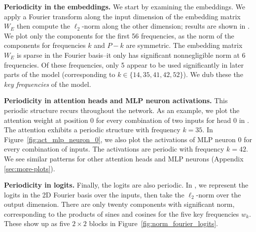 \documentclass{article} %
\begin{document}
\textbf{Periodicity in the embeddings.} We start by examining the embeddings. %
We apply a Fourier transform along the input dimension of the embedding matrix $W_E$ then compute the $\ell_2$-norm along the other dimension; results are shown in . We plot only the components for the first 56 frequencies, as the norm of the components for frequencies $k$ and $P-k$ are symmetric. The embedding matrix $W_E$ is sparse in the Fourier basis--it only has significant nonnegligible norm at 6 frequencies. Of these frequencies, only 5 appear to be used significantly in later  parts of the model 
(corresponding to $k \in  \{14, 35, 41, 42, 52\}$). We dub these the \emph{key frequencies} of the model.




\textbf{Periodicity in attention heads and MLP neuron activations.}
This periodic structure recurs throughout the network. As an example, we plot the attention weight at position 0 for every combination of two inputs for head 0 in . The attention exhibits a periodic structure with frequency $k=35$. %
In Figure~\ref{fig:act_mlp_neuron_0}, we also plot the activations of MLP neuron 0 for every combination of inputs. The activations are periodic with frequency $k=42$. We see similar patterns for other attention heads and MLP neurons (Appendix \ref{sec:more-plots}).


\textbf{Periodicity in logits.}
Finally, the logits are also periodic. In , we represent the logits in the 2D Fourier basis over the inputs, then take the $\ell_2$-norm over the output dimension. %
There are only twenty components with significant norm, corresponding to the products of sines and cosines for the five key frequencies $w_k$. These show up as five $2 \times 2$ blocks in Figure~\ref{fig:norm_fourier_logits}.
\end{document}
